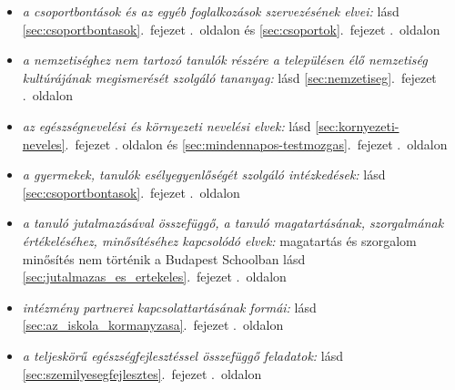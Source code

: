 \begin{itemize}
\item \emph{a csoportbontások és az egyéb foglalkozások szervezésének elvei: }    
       lásd        \ref{sec:csoportbontasok}.~fejezet .~oldalon és 
              \ref{sec:csoportok}.~fejezet .~oldalon
              
\item \emph{a nemzetiséghez nem tartozó tanulók részére a településen élő nemzetiség kultúrájának megismerését szolgáló tananyag: }    
       lásd        \ref{sec:nemzetiseg}.~fejezet .~oldalon
              
\item \emph{az egészségnevelési és környezeti nevelési elvek: }    
       lásd        \ref{sec:kornyezeti-neveles}.~fejezet
       . oldalon és 
              \ref{sec:mindennapos-testmozgas}.~fejezet .~oldalon
              
\item \emph{a gyermekek, tanulók esélyegyenlőségét szolgáló intézkedések: }    
       lásd        \ref{sec:csoportbontasok}.~fejezet .~oldalon
              
\item \emph{a tanuló jutalmazásával összefüggő, a tanuló magatartásának, szorgalmának értékeléséhez, minősítéséhez kapcsolódó elvek: }   magatartás és szorgalom minősítés nem történik a Budapest Schoolban 
       lásd        \ref{sec:jutalmazas_es_ertekeles}.~fejezet .~oldalon
              
\item \emph{intézmény partnerei kapcsolattartásának formái: }    
       lásd        \ref{sec:az_iskola_kormanyzasa}.~fejezet .~oldalon
              
\item \emph{a teljeskörű egészségfejlesztéssel összefüggő feladatok: }    
       lásd        \ref{sec:szemilyesegfejlesztes}.~fejezet .~oldalon
              
\end{itemize}

